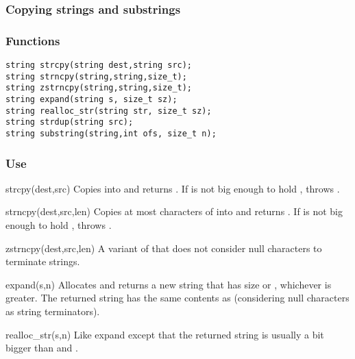 \subsubsection*{Copying strings and substrings}
\subsubsection*{Functions}
\begin{verbatim}
string strcpy(string dest,string src); 
string strncpy(string,string,size_t);
string zstrncpy(string,string,size_t);
string expand(string s, size_t sz);
string realloc_str(string str, size_t sz);
string strdup(string src);
string substring(string,int ofs, size_t n);
\end{verbatim}

\subsubsection*{Use}

\begin{defun}{strcpy}{(dest,src)}
Copies  into  and returns .  If 
is not big enough to hold ,  throws
.
\end{defun}

\begin{defun}{strncpy}{(dest,src,len)}
Copies at most  characters of  into  and
returns .  If  is not big enough to hold
,  throws
.
\end{defun}

\begin{defun}{zstrncpy}{(dest,src,len)}
A variant of  that does not consider null characters to
terminate strings.
\end{defun}

\begin{defun}{expand}{(s,n)}
Allocates and returns a new string that has size  or
, whichever is greater.  The returned string has
the same contents as  (considering null characters as string
terminators).
\end{defun}

\begin{defun}{realloc_str}{(s,n)}
Like expand except that the returned string is usually a bit bigger than
 and .
\end{defun}

